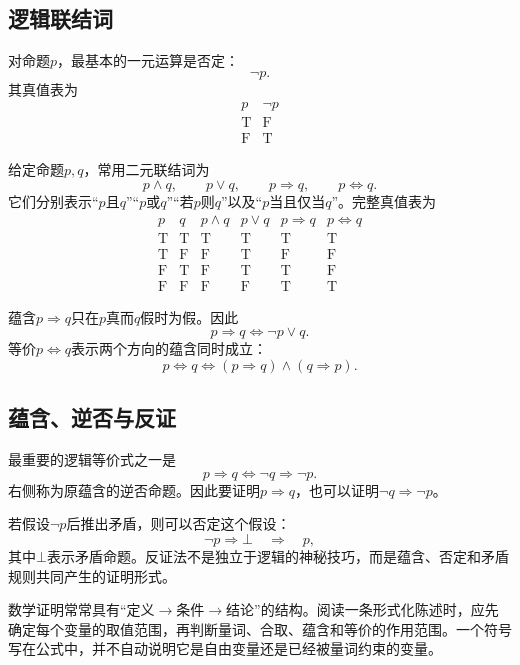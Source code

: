 \subsection{逻辑联结词}

对命题$p$，最基本的一元运算是否定：
\[
    \neg p.
\]
其真值表为
\[
\begin{array}{c|c}
    p&\neg p\\ \hline
    \mathrm T&\mathrm F\\
    \mathrm F&\mathrm T
\end{array}
\]

给定命题$p,q$，常用二元联结词为
\[
    p\land q,
    \qquad
    p\lor q,
    \qquad
    p\Rightarrow q,
    \qquad
    p\Leftrightarrow q.
\]
它们分别表示“$p$且$q$”“$p$或$q$”“若$p$则$q$”以及“$p$当且仅当$q$”。完整真值表为
\[
\begin{array}{c|c|c|c|c|c}
    p&q&p\land q&p\lor q&p\Rightarrow q&p\Leftrightarrow q\\ \hline
    \mathrm T&\mathrm T&\mathrm T&\mathrm T&\mathrm T&\mathrm T\\
    \mathrm T&\mathrm F&\mathrm F&\mathrm T&\mathrm F&\mathrm F\\
    \mathrm F&\mathrm T&\mathrm F&\mathrm T&\mathrm T&\mathrm F\\
    \mathrm F&\mathrm F&\mathrm F&\mathrm F&\mathrm T&\mathrm T
\end{array}
\]

蕴含$p\Rightarrow q$只在$p$真而$q$假时为假。因此
\[
    p\Rightarrow q
    \Longleftrightarrow
    \neg p\lor q.
\]
等价$p\Leftrightarrow q$表示两个方向的蕴含同时成立：
\[
    p\Leftrightarrow q
    \Longleftrightarrow
    (p\Rightarrow q)\land(q\Rightarrow p).
\]

\subsection{蕴含、逆否与反证}

最重要的逻辑等价式之一是
\[
    \boxed{
    p\Rightarrow q
    \Longleftrightarrow
    \neg q\Rightarrow\neg p.
    }
\]
右侧称为原蕴含的逆否命题。因此要证明$p\Rightarrow q$，也可以证明$\neg q\Rightarrow\neg p$。

若假设$\neg p$后推出矛盾，则可以否定这个假设：
\[
    \neg p\Rightarrow\bot
    \quad\Longrightarrow\quad
    p,
\]
其中$\bot$表示矛盾命题。反证法不是独立于逻辑的神秘技巧，而是蕴含、否定和矛盾规则共同产生的证明形式。

\begin{remark}
数学证明常常具有“定义$\longrightarrow$条件$\longrightarrow$结论”的结构。阅读一条形式化陈述时，应先确定每个变量的取值范围，再判断量词、合取、蕴含和等价的作用范围。一个符号写在公式中，并不自动说明它是自由变量还是已经被量词约束的变量。
\end{remark}

